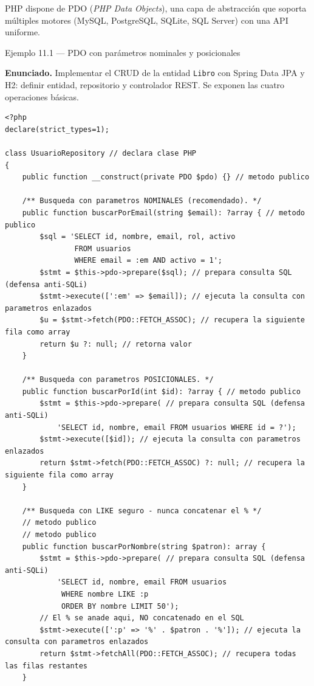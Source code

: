 PHP dispone de PDO (\emph{PHP Data Objects}), una capa de
abstracción que soporta múltiples motores (MySQL, PostgreSQL, SQLite,
SQL Server) con una API uniforme.


\begin{cajaejemplo}{Ejemplo 11.1 --- PDO con parámetros nominales y posicionales}

\textbf{Enunciado.} Implementar el CRUD de la entidad \texttt{Libro} con Spring Data JPA y H2: definir entidad, repositorio y controlador REST. Se exponen las cuatro operaciones básicas.

\begin{lstlisting}[style=php,caption={UsuarioRepository.php},label=lst:11.3]
<?php
declare(strict_types=1);

class UsuarioRepository // declara clase PHP
{
    public function __construct(private PDO $pdo) {} // metodo publico

    /** Busqueda con parametros NOMINALES (recomendado). */
    public function buscarPorEmail(string $email): ?array { // metodo publico
        $sql = 'SELECT id, nombre, email, rol, activo
                FROM usuarios
                WHERE email = :em AND activo = 1';
        $stmt = $this->pdo->prepare($sql); // prepara consulta SQL (defensa anti-SQLi)
        $stmt->execute([':em' => $email]); // ejecuta la consulta con parametros enlazados
        $u = $stmt->fetch(PDO::FETCH_ASSOC); // recupera la siguiente fila como array
        return $u ?: null; // retorna valor
    }

    /** Busqueda con parametros POSICIONALES. */
    public function buscarPorId(int $id): ?array { // metodo publico
        $stmt = $this->pdo->prepare( // prepara consulta SQL (defensa anti-SQLi)
            'SELECT id, nombre, email FROM usuarios WHERE id = ?');
        $stmt->execute([$id]); // ejecuta la consulta con parametros enlazados
        return $stmt->fetch(PDO::FETCH_ASSOC) ?: null; // recupera la siguiente fila como array
    }

    /** Busqueda con LIKE seguro - nunca concatenar el % */
    // metodo publico
    // metodo publico
    public function buscarPorNombre(string $patron): array {
        $stmt = $this->pdo->prepare( // prepara consulta SQL (defensa anti-SQLi)
            'SELECT id, nombre, email FROM usuarios
             WHERE nombre LIKE :p
             ORDER BY nombre LIMIT 50');
        // El % se anade aqui, NO concatenado en el SQL
        $stmt->execute([':p' => '%' . $patron . '%']); // ejecuta la consulta con parametros enlazados
        return $stmt->fetchAll(PDO::FETCH_ASSOC); // recupera todas las filas restantes
    }


\end{lstlisting}
\end{cajaejemplo}
